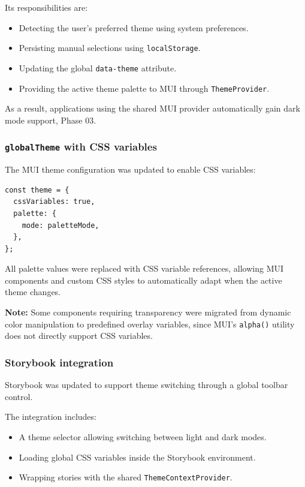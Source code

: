 Its responsibilities are:

\begin{itemize}
    \item Detecting the user's preferred theme using system preferences.
    \item Persisting manual selections using \lstinline|localStorage|.
    \item Updating the global \lstinline|data-theme| attribute.
    \item Providing the active theme palette to MUI through \texttt{ThemeProvider}.
\end{itemize}

As a result, applications using the shared MUI provider automatically gain dark mode support, Phase 03.

\subsubsection{\texttt{globalTheme} with CSS variables}

The MUI theme configuration was updated to enable CSS variables:

\begin{lstlisting}
const theme = {
  cssVariables: true,
  palette: {
    mode: paletteMode,
  },
};
\end{lstlisting}

All palette values were replaced with CSS variable references, allowing MUI components and custom CSS styles to automatically adapt when the active theme changes.

\textbf{Note:} Some components requiring transparency were migrated from dynamic color manipulation to predefined overlay variables, since MUI's \lstinline|alpha()| utility does not directly support CSS variables.

\subsubsection{Storybook integration}

Storybook was updated to support theme switching through a global toolbar control.

The integration includes:

\begin{itemize}
    \item A theme selector allowing switching between light and dark modes.
    \item Loading global CSS variables inside the Storybook environment.
    \item Wrapping stories with the shared \texttt{ThemeContextProvider}.
\end{itemize}

